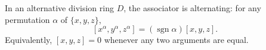 In an alternative division ring $D$, the associator is alternating: for any permutation $\alpha$ of $\{x, y, z\}$,
$$[x^\alpha, y^\alpha, z^\alpha] = (\operatorname{sgn} \alpha) [x, y, z].$$
Equivalently, $[x, y, z] = 0$ whenever any two arguments are equal.
